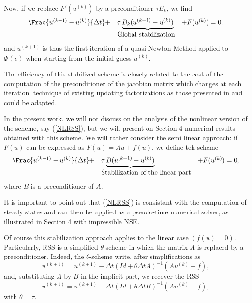 {Now, if we replace  $F'(u^{(k)})$ by a preconditioner $\tau B_k$, we
find
\begin{equation}
\begin{array}{lll}
\Frac{u^{(k+1)}-u^{(k)}}{\Delta t}+&\tau
\underbrace{B_k(u^{(k+1)}-u^{(k)})}&+F(u^{(k)})=0,\\
&\mbox{Global stabilization}& \\
\end{array}
\label{NLRSS1}
\end{equation}
and $u^{(k+1)}$ is thus the first iteration of a quasi Newton Method
applied to $\Phi(v)$ when starting from the initial guess $u^{(k)}$.

The efficiency of this stabilized scheme is closely related to the
cost of the computation of the preconditioner of the jacobian matrix which
changes at each iteration: technique of existing updating 
factorizations as those presented in \cite{CalgaroChehabSaad} and \cite {Bellavia} could
be adapted.

In the present work, we will not discuss on the analysis of the nonlinear version of the scheme, say (\ref{NLRSS}), but we will present on Section 4 numerical results obtained with this scheme. We will rather consider the semi linear approach: if $F(u)$ can be expressed as $F(u)=Au+f(u)$, we define teh scheme
\begin{equation}
\begin{array}{lll}
\Frac{u^{(k+1)}-u^{(k)}}{\Delta t}+&\tau
\underbrace{B(u^{(k+1)}-u^{(k)})}&+F(u^{(k)})=0,\\
&\mbox{Stabilization of the linear part}&\\
\end{array}
\label{NLRSS}
\end{equation}
where $B$ is a preconditioner of $A$.

It is important to point out that (\ref{NLRSS}) is consistant with the computation of steady states and can then be 
applied as a pseudo-time numerical solver, as illustrated in Section 4 with impressible NSE.

Of course this stabilization approach applies to the linear case $(f(u)=0)$. Particularly, 
RSS is a simplified $\theta$-scheme in which the matrix $A$ is replaced by a
preconditioner. Indeed, the $\theta$-scheme write, after
simplifications as
$$
u^{(k+1)}=u^{(k+1)}-\Delta t(Id +\theta\Delta t A)^{-1}(Au^{(k)}-f),
$$
and, substituting $A$ by $B$ in the implicit part, we recover the RSS
$$
u^{(k+1)}=u^{(k+1)}-\Delta t(Id +\theta\Delta t B)^{-1}(Au^{(k)}-f),
$$
with $\theta=\tau$.

}
